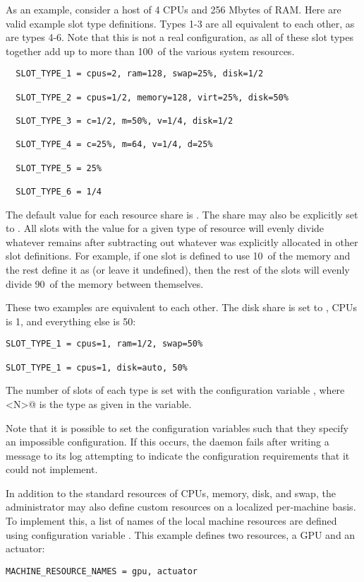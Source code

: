 As an example, consider a
host of 4 CPUs and 256 Mbytes of RAM.
Here are valid example slot type definitions. 
Types 1-3 are all equivalent to each other, as are types 4-6.
Note that this is not a real configuration, as all of these slot types together
add up to more than 100\Percent\ of the various system resources.

\begin{verbatim}
  SLOT_TYPE_1 = cpus=2, ram=128, swap=25%, disk=1/2

  SLOT_TYPE_2 = cpus=1/2, memory=128, virt=25%, disk=50%

  SLOT_TYPE_3 = c=1/2, m=50%, v=1/4, disk=1/2

  SLOT_TYPE_4 = c=25%, m=64, v=1/4, d=25%

  SLOT_TYPE_5 = 25%

  SLOT_TYPE_6 = 1/4
\end{verbatim}

The default value for each resource share is .  The share
may also be explicitly set to .  All slots with the value
 for a given type of resource will evenly divide
whatever remains after subtracting out whatever was explicitly
allocated in other slot definitions.  For example, if one slot is
defined to use 10\Percent\ of the memory and the rest define it as
 (or leave it undefined), then the rest of the slots will
evenly divide 90\Percent\ of the memory between themselves.

These two examples are equivalent to each other.
The disk share is set to ,
CPUs is 1, and everything else is 50\Percent:

\begin{verbatim}
SLOT_TYPE_1 = cpus=1, ram=1/2, swap=50%

SLOT_TYPE_1 = cpus=1, disk=auto, 50%
\end{verbatim}

The number of slots of each type is set with the
configuration variable
,
where \verb@<N>@ is the type as given in the
 variable.

Note that it is possible to set the configuration variables such
that they specify an impossible configuration.
If this occurs, the  daemon fails after writing
a message to its log attempting to indicate the configuration
requirements that it could not implement.


In addition to the standard resources of CPUs, memory, disk, and swap,
the administrator may also define custom resources on 
a localized per-machine basis.
To implement this, 
a list of names of the local machine resources are defined using configuration 
variable .
This example defines two resources,
a GPU and an actuator:
\begin{verbatim}
MACHINE_RESOURCE_NAMES = gpu, actuator
\end{verbatim}


